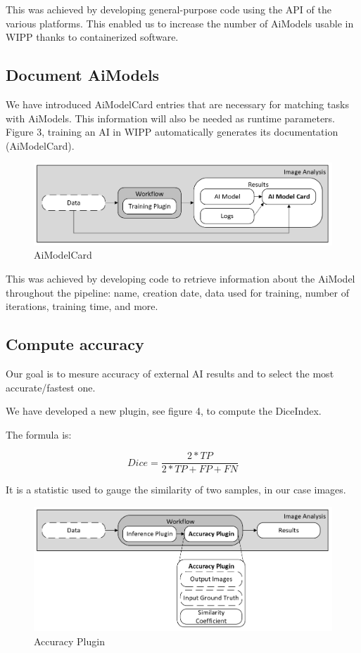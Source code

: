 This was achieved by developing general-purpose code using the \Gls{API} of
the various platforms. This
enabled us to increase the number of \Gls{AiModel}s usable
in \Gls{WIPP} thanks to containerized software.

\subsection{Document \Gls{AiModel}s}

We have introduced \Gls{AiModelCard} entries that are necessary for matching tasks
with \Gls{AiModel}s. This information will also be needed as runtime parameters.
Figure 3, training an \Gls{AI} in \Gls{WIPP} automatically generates its documentation
(\Gls{AiModelCard}).

\begin{figure}[H]
  \centering
  \includegraphics[width=1.0\linewidth]{png/methods/ai_model_card.png}
  \caption{\Gls{AiModelCard}}
  \label{fig:3aimodelcard}
\end{figure}

This was achieved by developing code to retrieve information about the \Gls{AiModel}
throughout the pipeline: name, creation date, data used for training, number of
iterations, training time, and more.

\subsection{Compute accuracy}

Our goal is to mesure accuracy of external AI results and to select the most
accurate/fastest one.

We have developed a new plugin, see figure 4, to compute the \Gls{DiceIndex}.

The formula is:

\[ Dice = \frac{2*TP}{2*TP + FP + FN} \]

It is a statistic used to gauge the similarity of two samples, in
our case images.

\begin{figure}[H]
  \centering
  \includegraphics[width=1.0\linewidth]{png/methods/accuracy.png}
  \caption{Accuracy Plugin}
  \label{fig:4accuracy}
\end{figure}

